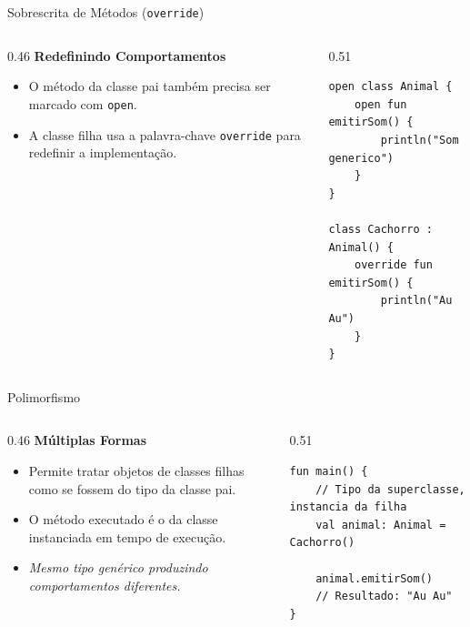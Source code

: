 \documentclass[aspectratio=169]{beamer}
\begin{document}
\begin{frame}[fragile]{Sobrescrita de Métodos (\texttt{override})}
  \begin{columns}[T]
    \begin{column}{0.46\textwidth}
      \textbf{Redefinindo Comportamentos}
      \vspace{0.3em}
      \begin{itemize}\small
        \item O método da classe pai também precisa ser marcado com \texttt{open}.
        \item A classe filha usa a palavra-chave \texttt{override} para redefinir a implementação.
      \end{itemize}
    \end{column}
    \begin{column}{0.51\textwidth}
\begin{lstlisting}[style=KotlinStyle]
open class Animal {
    open fun emitirSom() {
        println("Som generico")
    }
}

class Cachorro : Animal() {
    override fun emitirSom() {
        println("Au Au")
    }
}
\end{lstlisting}
    \end{column}
  \end{columns}
\end{frame}

\begin{frame}[fragile]{Polimorfismo}
  \begin{columns}[T]
    \begin{column}{0.46\textwidth}
      \textbf{Múltiplas Formas}
      \vspace{0.3em}
      \begin{itemize}\small
        \item Permite tratar objetos de classes filhas como se fossem do tipo da classe pai.
        \item O método executado é o da classe instanciada em tempo de execução.
        \item \textit{Mesmo tipo genérico produzindo comportamentos diferentes.}
      \end{itemize}
    \end{column}
    \begin{column}{0.51\textwidth}
\begin{lstlisting}[style=KotlinStyle]
fun main() {
    // Tipo da superclasse, instancia da filha
    val animal: Animal = Cachorro()

    animal.emitirSom() 
    // Resultado: "Au Au"
}
\end{lstlisting}
    \end{column}
  \end{columns}
\end{frame}
\end{document}
